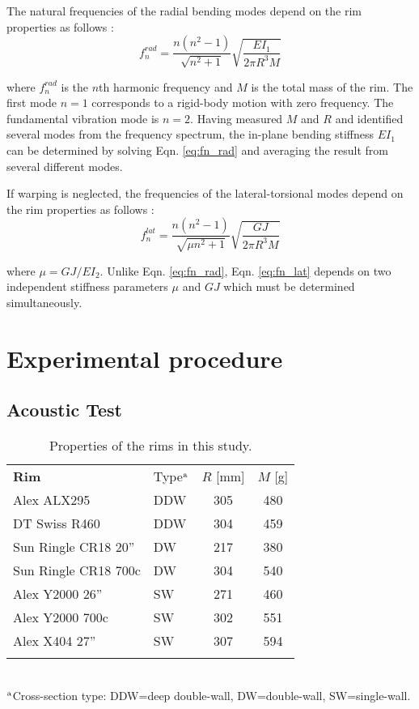 \documentclass[../thesis.tex]{subfiles}
\begin{document}
The natural frequencies of the radial bending modes depend on the rim properties as follows \cite{Timoshenko1955}:
  \begin{equation}\label{eq:fn_rad}
  f_n^{rad} = \frac{n(n^2-1)}{\sqrt{n^2+1}} \sqrt{\frac{EI_1}{2\pi R^3M}}
  \end{equation}

where $f_n^{rad}$ is the $n$th harmonic frequency and $M$ is the total mass of the rim. The first mode $n=1$ corresponds to a rigid-body motion with zero frequency. The fundamental vibration mode is $n=2$. Having measured $M$ and $R$ and identified several modes from the frequency spectrum, the in-plane bending stiffness $EI_1$ can be determined by solving Eqn. \eqref{eq:fn_rad} and averaging the result from several different modes.

If warping is neglected, the frequencies of the lateral-torsional modes depend on the rim properties as follows \cite{Timoshenko1955}:
  \begin{equation}\label{eq:fn_lat}
  f_n^{lat} = \frac{n(n^2-1)}{\sqrt{\mu n^2+1}} \sqrt{\frac{GJ}{2\pi R^3M}}
  \end{equation}

where $\mu=GJ/EI_{2}$. Unlike Eqn. \eqref{eq:fn_rad}, Eqn. \eqref{eq:fn_lat} depends on two independent stiffness parameters $\mu$ and $GJ$ which must be determined simultaneously.


\section{Experimental procedure}

\subsection{Acoustic Test}

  \begin{table}
  \caption{Properties of the rims in this study.\label{tb:rims}}
  \begin{tabular}{@{}llcc}
  \hline\noalign{\smallskip}
  \bf{Rim} & Type$^{\rm a}$ & $R$ [mm] & $M$ [g]\\
  \noalign{\smallskip}\hline\noalign{\smallskip}
  Alex ALX295          & DDW & 305 & 480\\
  DT Swiss R460        & DDW & 304 & 459\\
  Sun Ringle CR18 20'' & DW  & 217 & 380\\
  Sun Ringle CR18 700c & DW  & 304 & 540\\
  Alex Y2000 26''      & SW  & 271 & 460\\
  Alex Y2000 700c      & SW  & 302 & 551\\
  Alex X404 27''       & SW  & 307 & 594\\
  \noalign{\smallskip}\hline
  \end{tabular}\\
  $^{\rm a}$Cross-section type: DDW=deep double-wall, DW=double-wall, SW=single-wall.
  \end{table}
\end{document}
